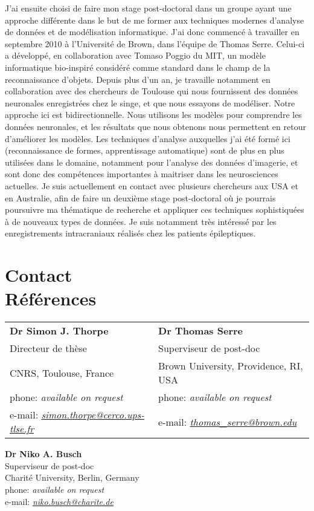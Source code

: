 \documentclass[margin,line]{resume}
\begin{document}
\begin{resume}
	J’ai ensuite choisi de faire mon stage post-doctoral dans un groupe ayant une approche différente dans le but de me former aux techniques modernes d’analyse de données et de modélisation informatique. J’ai donc commencé à travailler en septembre 2010 à l’Université de Brown, dans l’équipe de Thomas Serre. Celui-ci a développé, en collaboration avec Tomaso Poggio du MIT, un modèle informatique bio-inspiré considéré comme standard dans le champ de la reconnaissance d’objets. Depuis plus d’un an, je travaille notamment en collaboration avec des chercheurs de Toulouse qui nous fournissent des données neuronales enregistrées chez le singe, et que nous essayons de modéliser. Notre approche ici est bidirectionnelle. Nous utilisons les modèles pour comprendre les données neuronales, et les résultats que nous obtenons nous permettent en retour d’améliorer les modèles. Les techniques d’analyse auxquelles j’ai été formé ici (reconnaissance de formes, apprentissage automatique) sont de plus en plus utilisées dans le domaine, notamment pour l’analyse des données d’imagerie, et sont donc des compétences importantes à maitriser dans les neurosciences actuelles. Je suis actuellement en contact avec plusieurs chercheurs aux USA et en Australie, afin de faire un deuxième stage post-doctoral où je pourrais poursuivre ma thématique de recherche et appliquer ces techniques sophistiquées à de nouveaux types de données. Je suis notamment très intéressé par les enregistrements intracraniaux réalisés chez les patients épileptiques. 


\vspace{3mm}
\section{\mysidestyle Contact\\Références} 

	\begin{tabular}{@{}p{6cm}p{6cm}}
	\textbf{Dr Simon J. Thorpe}       &  \textbf{Dr Thomas Serre}                   \\
	Directeur de thèse                &  Superviseur de post-doc                       \\
	CNRS, Toulouse, France          &  Brown University, Providence, RI, USA        \\
	phone: \textsl{available on request}    &  phone: \textsl{available on request}     \\
	e-mail: \textsl{\href{mailto:simon.thorpe@cerco.ups-tlse.fr}{simon.thorpe@cerco.ups-tlse.fr}}   &  
	e-mail: \textsl{\href{mailto:thomas_serre@brown.edu}{thomas\_serre@brown.edu}}    \\
	\end{tabular}
	
	\textbf{Dr Niko A. Busch} \\
	Superviseur de post-doc\\
	Charité University, Berlin, Germany \\
	phone: \textsl{available on request} \\
	e-mail: \textsl{\href{mailto:niko.busch@charite.de}{niko.busch@charite.de}} \\


	
\end{resume}
\end{document}
